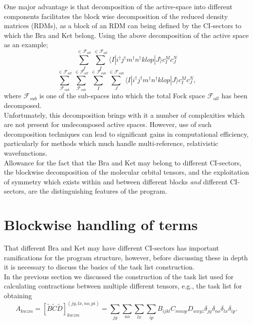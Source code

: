 \noindent One major advantage is that decomposition of the active-space
into different components facilitates the block wise decomposition of the reduced density matrices (RDMs),
as a block of an RDM can being defined by the CI-sectors to 
which the Bra and Ket belong. Using the above decomposition of the 
active space as an example;
\begin{equation*}
\sum_{J}^{ \in \mathcal{F}_{all} }
\sum_{I}^{ \in \mathcal{F}_{all} } \langle I | i^{\dagger}j^{\dagger}m^{\dagger}n^{\dagger}klop | J \rangle c^{M}_{I} c_{J}^{N}
\end{equation*}
\begin{equation*}
\sum^{ \in \mathcal{F}_{all} }_{ \mathcal{F}_{sub} }
\sum^{ \in \mathcal{F}_{all} }_{ \mathcal{F}_{sub} }
\sum^{ \in \mathcal{F}_{sub}}_{I}
\sum^{ \in \mathcal{F}_{sub}}_{J} \langle I | i^{\dagger}j^{\dagger}m^{\dagger}n^{\dagger}klop | J \rangle c^{M}_{I} c_{J}^{N},
\end{equation*}
\noindent where $\mathcal{F}_{sub}$ is one of the sub-spaces
into which the total Fock space $\mathcal{F}_{all}$ has been decomposed.\\

\noindent Unfortunately, this decomposition brings with it a number of
complexities which are not present for undecomposed active spaces. However, 
use of such decomposition techniques can lead to significant gains 
in computational efficiency, particularly for methods which much handle
multi-reference, relativistic wavefunctions.\\ 

\noindent Allowance for the fact that the Bra and Ket may belong to different CI-sectors,
the blockwise decomposition of the molecular orbital tensors, and the exploitation 
of symmetry which exists within and between different blocks \emph{and}  different CI-sectors,
are the distinguishing features of the program.

\section{ Blockwise handling of terms } 
\noindent That different Bra and Ket may have different CI-sectors has
important ramifications for the program structure, however, before discussing
these in depth it is necessary to discuss the basics of the task list
construction.\\

\noindent In the previous section we discussed the construction of the task list 
used for calculating contractions between multiple different tensors, e.g., the 
task list for obtaining
\begin{equation}
A_{kwzm} = 
[\tilde{B}\tilde{C}\tilde{D}]^{(jy,lx,no,pi)}_{kwzm} = \sum_{jy}\sum_{no}\sum_{lx}\sum_{ip} B_{ijkl}C_{mnop}D_{wxyz} \delta_{jy} \delta_{no} \delta_{lx}\delta_{ip}.
\end{equation}

